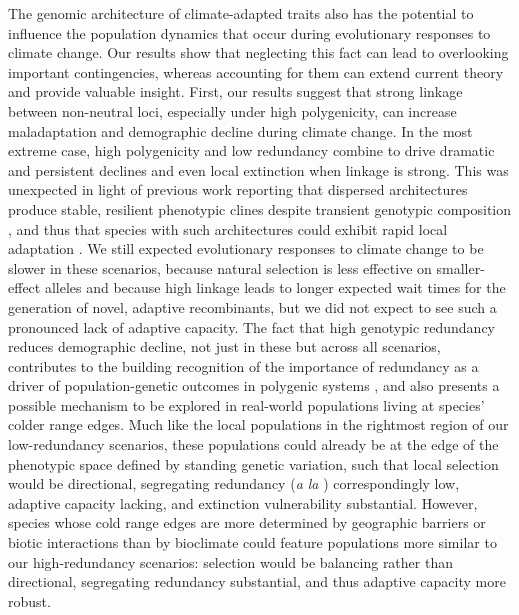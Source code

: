 \documentclass[9pt,twocolumn,twoside,lineno]{pnas-new}
\begin{document}
The genomic architecture of climate-adapted traits
also has the potential to influence the population dynamics
that occur during evolutionary responses to climate change.
Our results show that neglecting this fact
can lead to overlooking important contingencies,
whereas accounting for them can extend current theory and provide valuable insight.
First, our results suggest that strong linkage between non-neutral loci,
especially under high polygenicity, can increase maladaptation and demographic decline
during climate change. 
In the most extreme case, high polygenicity and low redundancy
combine to drive dramatic and persistent declines
and even local extinction when linkage is strong.
This was unexpected in light of previous work reporting
that dispersed architectures produce stable,
resilient phenotypic clines despite transient genotypic composition \cite{yeaman_amnat,yeaman_review},
and thus that species with such architectures
could exhibit rapid local adaptation \cite{aitken_yeaman}. 
We still expected evolutionary responses to climate change
to be slower in these scenarios,
because natural selection is less effective on smaller-effect alleles
and because high linkage leads to longer expected wait times for the generation
of novel, adaptive recombinants, but we did not expect
to see such a pronounced lack of adaptive capacity.
The fact that high genotypic redundancy reduces demographic decline,
not just in these but across all scenarios, contributes to the building recognition of the importance of redundancy
as a driver of population-genetic outcomes in polygenic systems
\cite{laruson,yeaman_review},
and also presents a possible mechanism to be explored
in real-world populations living at species' colder range edges.
Much like the local populations in the rightmost region of our low-redundancy scenarios,
these populations could already be at the edge of the phenotypic space defined by
standing genetic variation, such that local selection would be directional,
segregating redundancy (\textit{a la} \cite{laruson}) correspondingly low,
adaptive capacity lacking, and extinction vulnerability substantial.
However, species whose cold range edges are more determined by geographic barriers
or biotic interactions than by bioclimate \cite{thomas}
could feature populations more similar to our high-redundancy scenarios:
selection would be balancing rather than directional,
segregating redundancy substantial, and thus adaptive capacity more robust.
\end{document}
